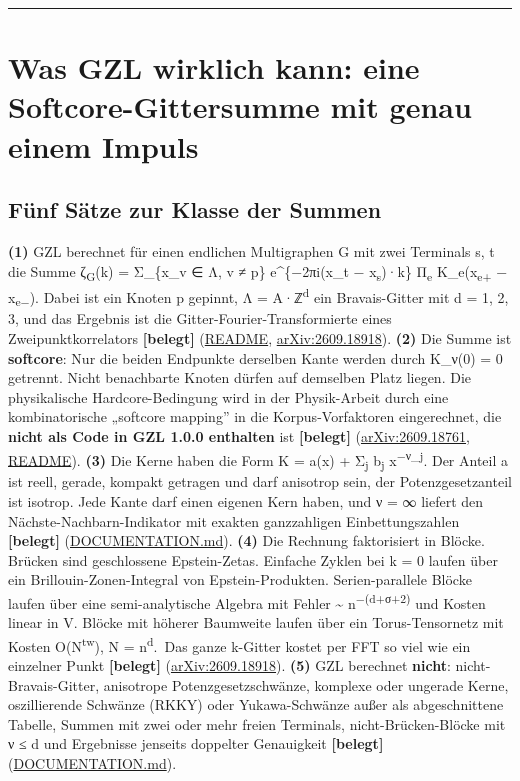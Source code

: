 \begin{center}\rule{0.5\linewidth}{0.5pt}\end{center}

\section{Was GZL wirklich kann: eine Softcore-Gittersumme mit genau einem Impuls}

\subsection{Fünf Sätze zur Klasse der Summen}

\textbf{(1)} GZL berechnet für einen endlichen Multigraphen G mit zwei Terminals s, t die Summe ζ\textsubscript{G}(k) = Σ\_\{x\_v ∈ Λ, v ≠ p\} e\^{}\{−2πi(x\_t − x\textsubscript{s})·k\} Π\textsubscript{e} K\_e(x\textsubscript{e+} − x\textsubscript{e−}). Dabei ist ein Knoten p gepinnt, Λ = A·ℤ\textsuperscript{d} ein Bravais-Gitter mit d = 1, 2, 3, und das Ergebnis ist die Gitter-Fourier-Transformierte eines Zweipunktkorrelators \textbf{{[}belegt{]}} (\href{https://github.com/graph-zeta/gzl}{README}, \href{https://arxiv.org/abs/2609.18918}{arXiv:2609.18918}). \textbf{(2)} Die Summe ist \textbf{softcore}: Nur die beiden Endpunkte derselben Kante werden durch K\_ν(0) = 0 getrennt. Nicht benachbarte Knoten dürfen auf demselben Platz liegen. Die physikalische Hardcore-Bedingung wird in der Physik-Arbeit durch eine kombinatorische „softcore mapping'' in die Korpus-Vorfaktoren eingerechnet, die \textbf{nicht als Code in GZL 1.0.0 enthalten} ist \textbf{{[}belegt{]}} (\href{https://arxiv.org/html/2609.18761}{arXiv:2609.18761}, \href{https://github.com/graph-zeta/gzl}{README}). \textbf{(3)} Die Kerne haben die Form K = a(x) + Σ\textsubscript{j} b\textsubscript{j} \textbar x\textbar{}\textsuperscript{−ν\_j}. Der Anteil a ist reell, gerade, kompakt getragen und darf anisotrop sein, der Potenzgesetzanteil ist isotrop. Jede Kante darf einen eigenen Kern haben, und ν = ∞ liefert den Nächste-Nachbarn-Indikator mit exakten ganzzahligen Einbettungszahlen \textbf{{[}belegt{]}} (\href{https://github.com/graph-zeta/gzl/blob/main/DOCUMENTATION.md}{DOCUMENTATION.md}). \textbf{(4)} Die Rechnung faktorisiert in Blöcke. Brücken sind geschlossene Epstein-Zetas. Einfache Zyklen bei k = 0 laufen über ein Brillouin-Zonen-Integral von Epstein-Produkten. Serien-parallele Blöcke laufen über eine semi-analytische Algebra mit Fehler \textasciitilde{} n\textsuperscript{−(d+σ+2)} und Kosten linear in \textbar V\textbar. Blöcke mit höherer Baumweite laufen über ein Torus-Tensornetz mit Kosten O(N\textsuperscript{tw}), N = n\textsuperscript{d}.~Das ganze k-Gitter kostet per FFT so viel wie ein einzelner Punkt \textbf{{[}belegt{]}} (\href{https://arxiv.org/html/2609.18918}{arXiv:2609.18918}). \textbf{(5)} GZL berechnet \textbf{nicht}: nicht-Bravais-Gitter, anisotrope Potenzgesetzschwänze, komplexe oder ungerade Kerne, oszillierende Schwänze (RKKY) oder Yukawa-Schwänze außer als abgeschnittene Tabelle, Summen mit zwei oder mehr freien Terminals, nicht-Brücken-Blöcke mit ν ≤ d und Ergebnisse jenseits doppelter Genauigkeit \textbf{{[}belegt{]}} (\href{https://github.com/graph-zeta/gzl/blob/main/DOCUMENTATION.md}{DOCUMENTATION.md}).

